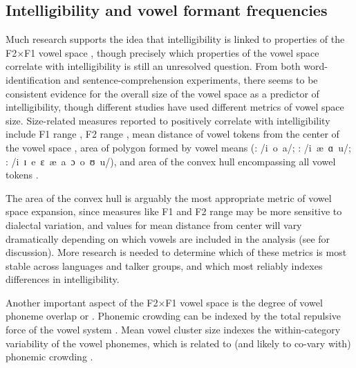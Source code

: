 \subsection{Intelligibility and vowel formant frequencies\label{sec:IntelVowel}}
Much research supports the idea that intelligibility is linked to properties of the F2×F1 vowel space \citep[\eg][]{BondMoore1994, BradlowEtAl1996, HazanMarkham2004, Neel2008, McCloyEtAl2013}, though precisely which properties of the vowel space correlate with intelligibility is still an unresolved question.  From both word-identification and sentence-comprehension experiments, there seems to be consistent evidence for the overall size of the vowel space as a predictor of intelligibility, though different studies have used different metrics of vowel space size.  Size-related measures reported to positively correlate with intelligibility include F1 range \citep{BradlowEtAl1996}, F2 range \citep{HazanMarkham2004}, mean distance of vowel tokens from the center of the vowel space \citep{BradlowEtAl1996, McCloyEtAl2013}, area of polygon formed by vowel means (\citealt{BradlowEtAl1996}: /i~o~a/; \citealt{Neel2008}: /i~æ~ɑ~u/;  \citealt{McCloyEtAl2012}: /i~ɪ~e~ɛ~æ~a~ɔ~o~ʊ~u/), and area of the convex hull encompassing all vowel tokens \citep{McCloyEtAl2013}.

The area of the convex hull is arguably the most appropriate metric of vowel space expansion, since measures like F1 and F2 range may be more sensitive to dialectal variation, and values for mean distance from center will vary dramatically depending on which vowels are included in the analysis (see \citealt{McCloyEtAl2013} for discussion).  More research is needed to determine which of these metrics is most stable across languages and talker groups, and which most reliably indexes differences in intelligibility.

Another important aspect of the F2×F1 vowel space is the degree of vowel phoneme overlap or .  Phonemic crowding can be indexed by the total repulsive force of the vowel system \citep[see][]{McCloyEtAl2013}.  Mean vowel cluster size indexes the within-category variability of the vowel phonemes, which is related to (and likely to co-vary with) phonemic crowding \citep{McCloyEtAl2013}.  


